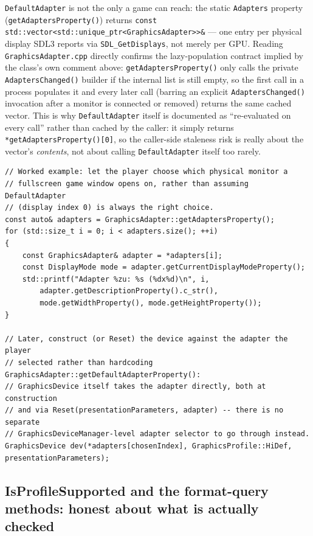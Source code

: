 \texttt{DefaultAdapter} is not the only  a game can reach: the static
\texttt{Adapters} property (\texttt{getAdaptersProperty()}) returns
\texttt{const std::vector<std::unique\_ptr<GraphicsAdapter>>\&} --- one entry per physical
display SDL3 reports via \texttt{SDL\_GetDisplays}, not merely per GPU. Reading
\texttt{GraphicsAdapter.cpp} directly confirms the lazy-population contract implied by the
class's own comment above: \texttt{getAdaptersProperty()} only calls the private
\texttt{AdaptersChanged()} builder if the internal list is still empty, so the first call in a
process populates it and every later call (barring an explicit \texttt{AdaptersChanged()}
invocation after a monitor is connected or removed) returns the same cached vector. This is
why \texttt{DefaultAdapter} itself is documented as ``re-evaluated on every call'' rather than
cached by the caller: it simply returns \texttt{*getAdaptersProperty()[0]}, so the caller-side
staleness risk is really about the vector's \emph{contents}, not about calling
\texttt{DefaultAdapter} itself too rarely.

\begin{lstlisting}
// Worked example: let the player choose which physical monitor a
// fullscreen game window opens on, rather than assuming DefaultAdapter
// (display index 0) is always the right choice.
const auto& adapters = GraphicsAdapter::getAdaptersProperty();
for (std::size_t i = 0; i < adapters.size(); ++i)
{
    const GraphicsAdapter& adapter = *adapters[i];
    const DisplayMode mode = adapter.getCurrentDisplayModeProperty();
    std::printf("Adapter %zu: %s (%dx%d)\n", i,
        adapter.getDescriptionProperty().c_str(),
        mode.getWidthProperty(), mode.getHeightProperty());
}

// Later, construct (or Reset) the device against the adapter the player
// selected rather than hardcoding GraphicsAdapter::getDefaultAdapterProperty():
// GraphicsDevice itself takes the adapter directly, both at construction
// and via Reset(presentationParameters, adapter) -- there is no separate
// GraphicsDeviceManager-level adapter selector to go through instead.
GraphicsDevice dev(*adapters[chosenIndex], GraphicsProfile::HiDef, presentationParameters);
\end{lstlisting}

\subsection{IsProfileSupported and the format-query methods: honest about what is actually checked}
\label{sec:adapter-format-queries}

